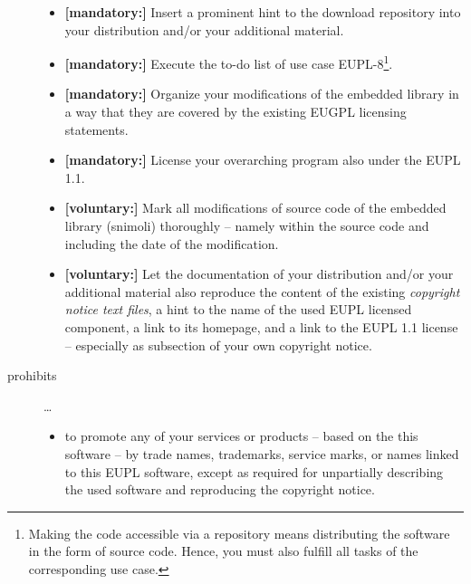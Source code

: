 \begin{description}
\begin{itemize}
  \item \textbf{[mandatory:]} Insert a prominent hint to the download repository
  into your distribution and/or your additional material.
  
  \item \textbf{[mandatory:]} Execute the to-do list of use case EUPL-8\footnote{
  Making the code accessible via a repository means distributing the software in
  the form of source code. Hence, you must also fulfill all tasks of the
  corresponding use case.}.
  
  \item \textbf{[mandatory:]} Organize your modifications of the embedded
  library in a way that they are covered by the existing EUGPL licensing
  statements. 
  
  \item \textbf{[mandatory:]} License your overarching program also under the
  EUPL 1.1.
  
  \item \textbf{[voluntary:]} Mark all modifications of source code of the
  embedded library (snimoli) thoroughly -- namely within the source code and
  including the date of the modification.

  \item \textbf{[voluntary:]} Let the documentation of your distribution and/or
  your additional material  also reproduce the content of the existing
  \emph{copyright notice text files}, a hint to the name of the used EUPL
  licensed component, a link to its homepage, and a link to the EUPL 1.1 license
  -- especially as subsection of your own copyright notice.
  
\end{itemize}

\item[prohibits] \ldots
\begin{itemize}
  \item to promote any of your services or products -- based on the this software
  -- by trade names, trademarks, service marks, or names linked to this EUPL
  software, except as required for unpartially describing the used software and
  reproducing the copyright notice.
\end{itemize}

\end{description}

